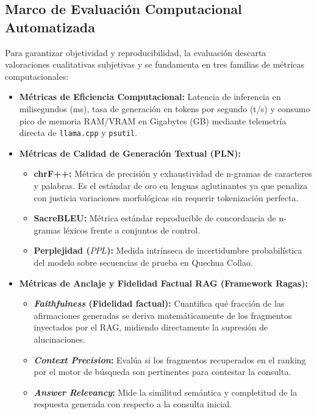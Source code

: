 \subsection{Marco de Evaluación Computacional Automatizada}
Para garantizar objetividad y reproducibilidad, la evaluación descarta valoraciones cualitativas subjetivas y se fundamenta en tres familias de métricas computacionales:
\begin{itemize}
    \item \textbf{Métricas de Eficiencia Computacional:} Latencia de inferencia en milisegundos (ms), tasa de generación en tokens por segundo (t/s) y consumo pico de memoria RAM/VRAM en Gigabytes (GB) mediante telemetría directa de \texttt{llama.cpp} y \texttt{psutil}.
    \item \textbf{Métricas de Calidad de Generación Textual (PLN):}
    \begin{itemize}
        \item \textbf{chrF++:} Métrica de precisión y exhaustividad de n-gramas de caracteres y palabras. Es el estándar de oro en lenguas aglutinantes ya que penaliza con justicia variaciones morfológicas sin requerir tokenización perfecta.
        \item \textbf{SacreBLEU:} Métrica estándar reproducible de concordancia de n-gramas léxicos frente a conjuntos de control.
        \item \textbf{Perplejidad ($PPL$):} Medida intrínseca de incertidumbre probabilística del modelo sobre secuencias de prueba en Quechua Collao.
    \end{itemize}
    \item \textbf{Métricas de Anclaje y Fidelidad Factual RAG (Framework Ragas):}
    \begin{itemize}
        \item \textbf{\textit{Faithfulness} (Fidelidad factual):} Cuantifica qué fracción de las afirmaciones generadas se deriva matemáticamente de los fragmentos inyectados por el RAG, midiendo directamente la supresión de alucinaciones.
        \item \textbf{\textit{Context Precision}:} Evalúa si los fragmentos recuperados en el ranking por el motor de búsqueda son pertinentes para contestar la consulta.
        \item \textbf{\textit{Answer Relevancy}:} Mide la similitud semántica y completitud de la respuesta generada con respecto a la consulta inicial.
    \end{itemize}
\end{itemize}

